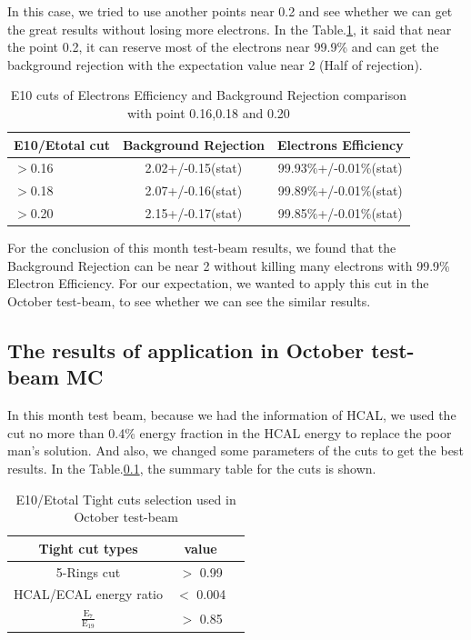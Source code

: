 In this case, we tried to use another points near 0.2 and see whether we can get the great results without losing more electrons. In the Table.\ref{basic_2}, it said that near the point 0.2, it can reserve most of the electrons near 99.9\% and can get the background rejection with the expectation value near 2 (Half of rejection). 

\begin{table}[h]%
    \centering
    \begin{tabular}{|l|c|c|}
    \hline
    E10/Etotal cut  & Background Rejection  &  Electrons Efficiency\\\hline
    $>$0.16 & 2.02+/-0.15(stat)   & 99.93\%+/-0.01\%(stat) \\\hline
    $>$0.18 & 2.07+/-0.16(stat)   & 99.89\%+/-0.01\%(stat) \\\hline
    $>$0.20 & 2.15+/-0.17(stat)   & 99.85\%+/-0.01\%(stat) \\\hline
    \end{tabular}
    \caption{E10 cuts of Electrons Efficiency and Background Rejection comparison with point 0.16,0.18 and 0.20}\label{basic_2}  %
\end{table}

For the conclusion of this month test-beam results, we found that the Background Rejection can be near 2 without killing many electrons with 99.9\% Electron Efficiency. For our expectation, we wanted to apply this cut in the October test-beam, to see whether we can see the similar results. 

\subsection{The results of application in October test-beam MC}
In this month test beam, because we had the information of HCAL, we used the cut no more than 0.4\% energy fraction in the HCAL energy to replace the poor man's solution. And also, we changed some parameters of the cuts to get the best results. In the Table.\ref{}, the summary table for the cuts is shown.

\begin{table}[h]%
    \centering
    \begin{tabular}{|c|c|c|}
    \hline
    Tight cut types & value\\\hline
    5-Rings cut &  $>$ 0.99 \\\hline  
    HCAL/ECAL energy ratio & $<$ 0.004 \\\hline  
    $\mathrm{\frac{E_{7}}{E_{19}}}$ & $>$ 0.85\\\hline  
        \end{tabular}
    \caption{E10/Etotal Tight cuts selection used in October test-beam}\label{basic_1}  %
\end{table}

